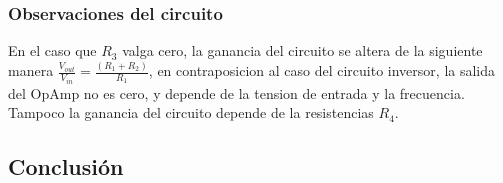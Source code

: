 \documentclass[../../main.tex]{subfiles}
\begin{document}
\subsubsection{Observaciones del circuito}
En el caso que $R_{3}$ valga cero, la ganancia del circuito se altera de la siguiente manera $ \frac{V_{out}}{V_{in}}=\frac {(R_{1}+R_{2})}{R_{1}}$, en contraposicion al caso del circuito inversor, la salida del OpAmp no es cero, y depende de la tension de entrada y la frecuencia. Tampoco la ganancia del circuito depende de la resistencias $R_{4}$.


\subsection{Conclusión}
\end{document}
